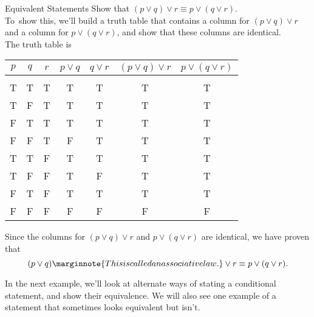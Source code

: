 \begin{example}[https://www.youtube.com/watch?v=RVZ8X7gFzio]{Equivalent Statements}
Show that $(p \vee q) \vee r \equiv p \vee (q \vee r)$.\\

To\sol\ show this, we'll build a truth table that contains a column for $(p \vee q) \vee r$ and a column for $p \vee (q \vee r)$, and show that these columns are identical.\\

The truth table is 
\begin{center}
\begin{tabular}{|c c c c c c c|}
\hline
$p$ & $q$ & $r$ & $p \vee q$ & $q \vee r$ & $(p \vee q) \vee r$ & $p \vee (q \vee r)$\\
\hline
& & & & & & \\
T & T & T & T & T & T & T\\
T & F & T & T & T & T & T\\
F & T & T & T & T & T & T\\
F & F & T & F & T & T & T\\
T & T & F & T & T & T & T\\
T & F & F & T & F & T & T\\
F & T & F & T & T & T & T\\
F & F & F & F & F & F & F\\
\hline
\end{tabular}
\end{center}

Since the columns for $(p \vee q) \vee r$ and $p \vee (q \vee r)$ are identical, we have proven that \[(p \vee q)\marginnote{This is called an associative law.} \vee r \equiv p \vee (q \vee r).\]
\end{example}

In the next example, we'll look at alternate ways of stating a conditional statement, and show their equivalence.  We will also see one example of a statement that sometimes looks equivalent but isn't.
\vfill
\pagebreak

